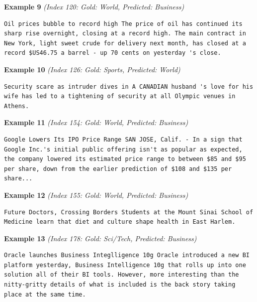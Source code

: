 \noindent
\textbf{Example 9} \quad \textit{(Index 120: Gold: World, Predicted: Business)}

\begin{Verbatim}[breaklines=true,breakanywhere=true,fontsize=\small]
Oil prices bubble to record high The price of oil has continued its sharp rise overnight, closing at a record high. The main contract in New York, light sweet crude for delivery next month, has closed at a record $US46.75 a barrel - up 70 cents on yesterday 's close.
\end{Verbatim}

\noindent
\textbf{Example 10} \quad \textit{(Index 126: Gold: Sports, Predicted: World)}

\begin{Verbatim}[breaklines=true,breakanywhere=true,fontsize=\small]
Security scare as intruder dives in A CANADIAN husband 's love for his wife has led to a tightening of security at all Olympic venues in Athens.
\end{Verbatim}

\noindent
\textbf{Example 11} \quad \textit{(Index 154: Gold: World, Predicted: Business)}

\begin{Verbatim}[breaklines=true,breakanywhere=true,fontsize=\small]
Google Lowers Its IPO Price Range SAN JOSE, Calif. - In a sign that Google Inc.'s initial public offering isn't as popular as expected, the company lowered its estimated price range to between $85 and $95 per share, down from the earlier prediction of $108 and $135 per share...
\end{Verbatim}

\noindent
\textbf{Example 12} \quad \textit{(Index 155: Gold: World, Predicted: Business)}

\begin{Verbatim}[breaklines=true,breakanywhere=true,fontsize=\small]
Future Doctors, Crossing Borders Students at the Mount Sinai School of Medicine learn that diet and culture shape health in East Harlem.
\end{Verbatim}

\noindent
\textbf{Example 13} \quad \textit{(Index 178: Gold: Sci/Tech, Predicted: Business)}

\begin{Verbatim}[breaklines=true,breakanywhere=true,fontsize=\small]
Oracle launches Business Integlligence 10g Oracle introduced a new BI platform yesterday, Business Intelligence 10g that rolls up into one solution all of their BI tools. However, more interesting than the nitty-gritty details of what is included is the back story taking place at the same time.
\end{Verbatim}

